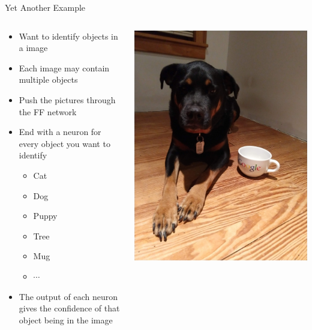 \documentclass[aspectratio=169]{beamer}
\begin{document}
\begin{frame}{Yet Another Example}

\begin{columns}
\begin{column}{0.6\textwidth}
\begin{itemize}
	\item Want to identify objects in a image
	\item Each image may contain multiple objects
	\item Push the pictures through the FF network
	\item End with a neuron for every object you want to identify
	\begin{itemize}
		\item Cat
		\item Dog
		\item Puppy
		\item Tree
		\item Mug
		\item $\cdots$
	\end{itemize}
	\item The output of each neuron gives the confidence of that object being in the image
\end{itemize}
\end{column}
\begin{column}{0.4\textwidth}
\includegraphics[angle=-90,width=1\textwidth]{lectFF/dogAndMug.jpg}
\end{column}
\end{columns}
	\end{frame}
\end{document}
